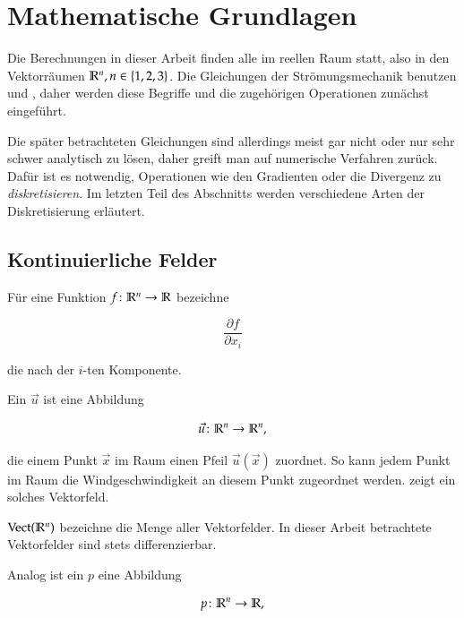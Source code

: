 \section{Mathematische Grundlagen}
\label{sec:mathematics}

Die Berechnungen in dieser Arbeit finden alle im reellen Raum statt, also in den
Vektorräumen $\mathbb{R}^n, n \in \{1,2,3\}$. Die Gleichungen der
Strömungsmechanik benutzen  und
, daher werden diese Begriffe und die zugehörigen
Operationen zunächst eingeführt.

Die später betrachteten Gleichungen sind allerdings meist gar nicht oder nur sehr
schwer analytisch zu lösen, daher greift man auf numerische Verfahren zurück.
Dafür ist es notwendig, Operationen wie den Gradienten oder die
Divergenz zu \emph{diskretisieren}. Im letzten Teil des Abschnitts
werden verschiedene Arten der Diskretisierung erläutert.

\subsection{Kontinuierliche Felder}

Für eine Funktion $f \colon \mathbb{R}^n \to \mathbb{R}$ bezeichne

\begin{equation}
\frac{\partial f}{\partial x_i}
\end{equation}

die  nach der $i$-ten Komponente.

Ein  $\vec{u}$ ist eine Abbildung

\begin{equation*}
\vec{u} \colon \mathbb{R}^n \to \mathbb{R}^n,
\end{equation*}

die einem Punkt $\vec{x}$ im Raum einen Pfeil $\vec{u}(\vec{x})$
zuordnet. So kann \PimiddyzB{}jedem Punkt im Raum die
Windgeschwindigkeit an diesem Punkt zugeordnet
werden.  zeigt ein solches
Vektorfeld.

$\operatorname*{Vect}(\mathbb{R}^n)$ bezeichne die Menge aller
Vektorfelder. In dieser Arbeit betrachtete Vektorfelder sind stets
differenzierbar.

Analog ist ein  $p$ eine Abbildung

\begin{equation*}
p \colon \mathbb{R}^n \to \mathbb{R},
\end{equation*}

